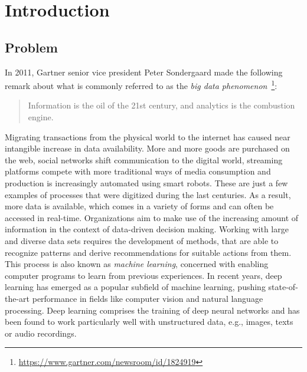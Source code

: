 \section{Introduction}

\subsection{Problem}
\label{sec:problem}

In 2011, Gartner senior vice president Peter Sondergaard made the following remark
about what is commonly referred to as the \textit{big data phenomenon}~\footnote{\url{https://www.gartner.com/newsroom/id/1824919}}:

\begin{quote}
  Information is the oil of the 21st century, and analytics is the combustion engine.
\end{quote}

Migrating transactions from the physical world to the internet has caused near
intangible increase in data availability.
More and more goods are purchased on the web, social networks shift communication
to the digital world, streaming platforms compete with more traditional ways
of media consumption and production is increasingly automated using smart robots.
These are just a few examples of processes that were digitized during the last
centuries.
As a result, more data is available, which comes in a variety of forms and
can often be accessed in real-time.
Organizations aim to make use of the increasing amount of information in the
context of data-driven decision making.
Working with large and diverse data sets requires the development of methods,
that are able to recognize patterns and derive recommendations for suitable
actions from them.
This process is also known as \textit{machine learning}, concerned with
enabling computer programs to learn from previous experiences.
In recent years, deep learning has emerged as a popular subfield of machine
learning, pushing state-of-the-art performance in fields like computer vision and
natural language processing.
Deep learning comprises the training of deep neural networks and has been found 
to work particularly well with unstructured data, e.g., images, texts or audio 
recordings.

